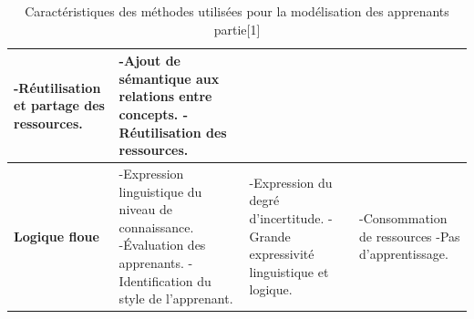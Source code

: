 \begin{table}[!htbp]
\begin{tabular}{|m{3cm}|m{4cm}|m{4cm}|m{4cm}|}
	  -Réutilisation et partage des ressources.&
	  -Ajout de sémantique aux relations entre concepts. \newline
	  -Réutilisation des ressources.&  \\ \hline
	  \textbf{Logique floue}  &
	  -Expression linguistique du niveau de connaissance. \newline
	  -Évaluation des apprenants.\newline
	  -Identification du style de l'apprenant.&
	  -Expression du degré d'incertitude. \newline
	  -Grande expressivité linguistique et logique.&
	  -Consommation de ressources \newline
	  -Pas d'apprentissage. \\ \hline
	\end{tabular}
	\caption{Caractéristiques des méthodes utilisées pour la modélisation des apprenants partie[1]}
	\label{Caracteristiques_modelisation_apprenants1}
\end{table}

